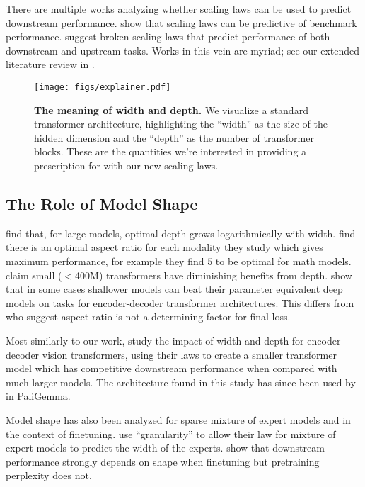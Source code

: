 There are multiple works analyzing whether scaling laws can be used to predict downstream performance.
\citet{observational} show that scaling laws can be predictive of benchmark performance.
\citet{caballero2023broken} %
suggest broken scaling laws that predict performance of both downstream and upstream tasks. Works in this vein are myriad; see our extended literature review in .

\begin{figure}[t!]
    \centering
    \texttt{[image: figs/explainer.pdf]}
    \caption{\textbf{The meaning of width and depth. }We visualize a standard transformer architecture, highlighting the ``width'' as the size of the hidden dimension and the ``depth'' as the number of transformer blocks. These are the quantities we're interested in providing a prescription for with our new scaling laws.}\label{fig:summary}
\end{figure}

\subsection{The Role of Model Shape}
\citet{interplay} find that, for large models, optimal depth grows logarithmically with width. 
\citet{henighan2020scaling} find there is an optimal aspect ratio for each modality they study which gives maximum performance, for example they find \(5\) to be optimal for math models.
\citet{petty2024impact} claim small ($<$400M) transformers have diminishing benefits from depth.
\citet{brown2022wide} show that in some cases shallower models can beat their parameter equivalent deep models on tasks for encoder-decoder transformer architectures.
This differs from \citet{kaplan2020scaling} who suggest aspect ratio is not a determining factor for final loss.

Most similarly to our work, \citet{alabdulmohsin2024getting} study the impact of width and depth for encoder-decoder vision transformers, using their laws to create a smaller transformer model which has competitive downstream performance when compared with much larger models.
The architecture found in this study has since been used by \citet{beyer2024paligemma} in PaliGemma.

Model shape has also been analyzed for sparse mixture of expert models and in the context of finetuning.
\citet{krajewski2024scaling} use ``granularity'' to allow their law for mixture of expert models to predict the width of the experts. 
\citet{scaleEfficiently} show that downstream performance strongly depends on shape when finetuning but pretraining perplexity does not.

